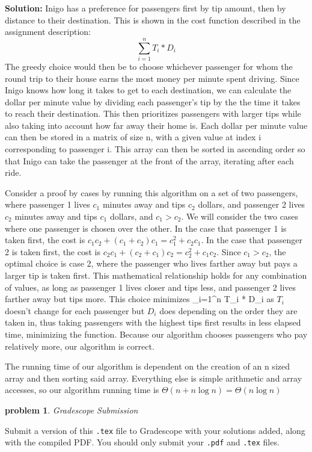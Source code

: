 \documentclass[10pt]{article}
\newcommand{\solution}[1]{\color{blue}\hfill\break\noindent\textbf{Solution:} #1\color{black}}
\newtheorem{problem}{\sc\color{cit}problem}
\begin{document}
\solution{
Inigo has a preference for passengers first by tip amount, then by distance to their destination. This is shown in the cost function described in the assignment description:
\[ \sum_{i=1}^{n} T_i * D_i\]
The greedy choice would then be to choose whichever passenger for whom the round trip to their house earns the most money per minute spent driving. Since Inigo knows how long it takes to get to each destination, we can calculate the dollar per minute value by dividing each passenger’s tip by the the time it takes to reach their destination. This then prioritizes passengers with larger tips while also taking into account how far away their home is. Each dollar per minute value can then be stored in a matrix of size n, with a given value at index i corresponding to passenger i. This array can then be sorted in ascending order so that Inigo can take the passenger at the front of the array, iterating after each ride.

Consider a proof by cases by running this algorithm on a set of two passengers, where passenger 1 lives $c_1$ minutes away and tips $c_2$ dollars, and passenger 2 lives $c_2$ minutes away and tips $c_1$ dollars, and $c_1 > c_2$. We will consider the two cases where one passenger is chosen over the other. In the case that passenger 1 is taken first, the cost is $c_1c_2 + (c_1 + c_2)c_1 = c_1^2 + c_2c_1$. In the case that passenger 2 is taken first, the cost is $c_2c_1 + (c_2+c_1)c_2 = c_2^2 + c_1c_2$. Since $c_1 > c_2$, the optimal choice is case 2, where the passenger who lives farther away but pays a larger tip is taken first. This mathematical relationship holds for any combination of values, as long as passenger 1 lives closer and tips less, and passenger 2 lives farther away but tips more. This choice minimizes  \sum_{i=1}^{n} T_i * D_i as $T_i$ doesn't change for each passenger but $D_i$ does depending on the order they are taken in, thus taking passengers with the highest tips first results in less elapsed time, minimizing the function. Because our algorithm chooses passengers who pay relatively more, our algorithm is correct. 

The running time of our algorithm is dependent on the creation of an n sized array and then sorting said array. Everything else is simple arithmetic and array accesses, so our algorithm running time is $\Theta(n + n\log n) = \Theta(n\log n)$

}

\begin{problem} Gradescope Submission \end{problem}
Submit a version of this \verb|.tex| file to Gradescope with your solutions added, along with the compiled PDF.  You should only submit your \verb|.pdf| and \verb|.tex| files.
\end{document}

